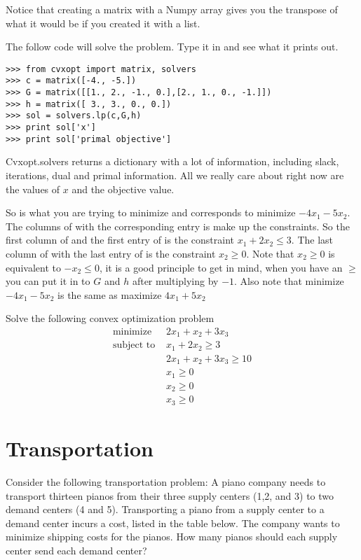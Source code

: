 Notice that creating a matrix with a Numpy array gives you the transpose of what it would be if you created it with a list.

The follow code will solve the problem. Type it in and see what it prints out.
\begin{lstlisting}
>>> from cvxopt import matrix, solvers
>>> c = matrix([-4., -5.])
>>> G = matrix([[1., 2., -1., 0.],[2., 1., 0., -1.]])
>>> h = matrix([ 3., 3., 0., 0.])
>>> sol = solvers.lp(c,G,h)  
>>> print sol['x']
>>> print sol['primal objective']
\end{lstlisting}
Cvxopt.solvers returns a dictionary with a lot of information, including slack, iterations, dual and primal information.
All we really care about right now are the values of $x$ and the objective value.

So  is what you are trying to minimize and corresponds to minimize $-4x_1-5x_2$. The columns of  with the corresponding entry is  make up the constraints. So the first column of  and the first entry of  is the constraint $x_1+2x_2 \leq 3$. The last column of  with the last entry of  is the constraint $x_2 \geq 0$. Note that $x_2 \geq 0$ is equivalent to $-x_2 \leq 0$, it is a good principle to get in mind, when you have an $\geq$ you can put it in to $G$ and $h$ after multiplying by $-1$. Also note that minimize $-4x_1-5x_2$ is the same as maximize $4x_1+5x_2$

\begin{problem}

Solve the following convex optimization problem
\begin{align*}
\text{minimize } &2x_1+x_2+3x_3 \\
\text{subject to } &x_1+2x_2 \geq 3 \\
	        &2x_1+x_2+3x_3 \geq 10 \\
		&x_1 \geq 0 \\
		&x_2 \geq 0 \\
		&x_3 \geq 0
\end{align*}
\end{problem}

\section*{Transportation}

Consider the following transportation problem:
A piano company needs to transport thirteen pianos from their three  supply centers (1,2, and 3) to two demand centers (4 and 5).
Transporting a piano from a supply center to a demand center incurs a cost, listed in the table below.
The company wants to minimize shipping costs for the pianos.
How many pianos should each supply center send each demand center?

